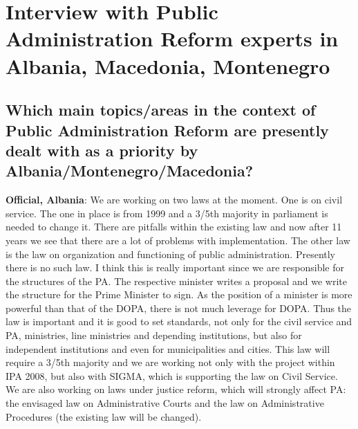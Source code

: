 
\chapter{Interview with Public Administration Reform experts in Albania, Macedonia, Montenegro}
\label{anhang:InterviewPARExperts}

\section{Which main topics/areas in the context of Public Administration Reform are presently dealt with as a priority by Albania/Montenegro/Macedonia? }
\label{sec:par macedonia}
\textbf{Official, Albania}: We are working on two laws at the moment. One is on civil service. The one in place is from 1999 and a 3/5th majority in parliament is needed to change it. There are pitfalls within the existing law and now after 11 years we see that there are a lot of problems with implementation. The other law is the law on organization and functioning of public administration. Presently there is no such law. I think this is really important since we are responsible for the structures of the PA. The respective minister writes a proposal and we write the structure for the Prime Minister to sign. As the position of a minister is more powerful than that of the DOPA, there is not much leverage for DOPA. Thus the law is important and it is good to set standards, not only for the civil service and PA, ministries, line ministries and depending institutions, but also for independent institutions and even for municipalities and cities. This law will require a 3/5th majority and we are working not only with the project within IPA 2008, but also with SIGMA, which is supporting the law on Civil Service. We are also working on laws under justice reform, which will strongly affect PA: the envisaged law on Administrative Courts and the law on Administrative Procedures (the existing law will be changed).\\
